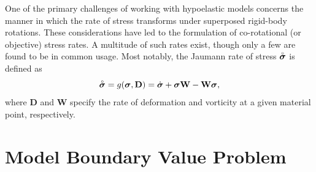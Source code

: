One of the primary challenges of working with hypoelastic models concerns the manner in which the rate of stress transforms under superposed rigid-body rotations. These considerations have led to the formulation of co-rotational (or objective) stress rates. A multitude of such rates exist, though only a few are found to be in common usage. Most notably, the Jaumann rate of stress $\accentset{\circ}{\boldsymbol{\sigma}}$ is defined as
\begin{equation}
  \accentset{\circ}{\boldsymbol{\sigma}} = g (\boldsymbol{\sigma}, \mathbf{D}) = \dot{\boldsymbol{\sigma}} + \boldsymbol{\sigma} \mathbf{W} - \mathbf{W} \boldsymbol{\sigma},
\end{equation}
where $\mathbf{D}$ and $\mathbf{W}$ specify the rate of deformation and vorticity at a given material point, respectively.

%
%
%

\section{Model Boundary Value Problem}

